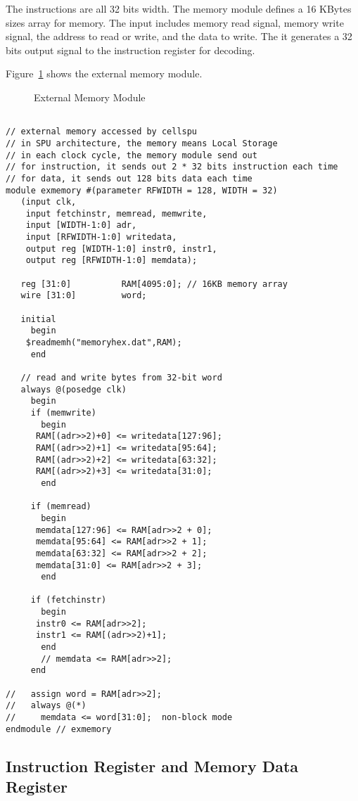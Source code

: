 \documentclass[preprint,authoryear,12pt]{elsarticle}
\begin{document}
The instructions are all 32 bits width. The memory module defines a 16
KBytes sizes array for memory. The input includes memory read signal,
memory write signal, the address to read or write, and the data to
write. The it generates a 32 bits output signal to the instruction
register for decoding.

Figure~\ref{fig:mem} shows the external memory module.

\begin{figure}
\centering
{}
\caption{External Memory Module}
\label{fig:mem}
\end{figure}


\begin{verbatim}

// external memory accessed by cellspu
// in SPU architecture, the memory means Local Storage
// in each clock cycle, the memory module send out
// for instruction, it sends out 2 * 32 bits instruction each time
// for data, it sends out 128 bits data each time
module exmemory #(parameter RFWIDTH = 128, WIDTH = 32)
   (input clk,
    input fetchinstr, memread, memwrite,
    input [WIDTH-1:0] adr,
    input [RFWIDTH-1:0] writedata,
    output reg [WIDTH-1:0] instr0, instr1,
    output reg [RFWIDTH-1:0] memdata);

   reg [31:0] 		   RAM[4095:0]; // 16KB memory array
   wire [31:0] 		   word;

   initial
     begin
	$readmemh("memoryhex.dat",RAM);
     end

   // read and write bytes from 32-bit word
   always @(posedge clk)
     begin
     if (memwrite)
       begin
	  RAM[(adr>>2)+0] <= writedata[127:96];
	  RAM[(adr>>2)+1] <= writedata[95:64];
	  RAM[(adr>>2)+2] <= writedata[63:32];
	  RAM[(adr>>2)+3] <= writedata[31:0];
       end

     if (memread)
       begin
	  memdata[127:96] <= RAM[adr>>2 + 0];
	  memdata[95:64] <= RAM[adr>>2 + 1];
	  memdata[63:32] <= RAM[adr>>2 + 2];
	  memdata[31:0] <= RAM[adr>>2 + 3];
       end
	
     if (fetchinstr)
       begin
	  instr0 <= RAM[adr>>2];
	  instr1 <= RAM[(adr>>2)+1];
       end
       // memdata <= RAM[adr>>2];
     end
   
//   assign word = RAM[adr>>2];
//   always @(*)
//     memdata <= word[31:0];  non-block mode
endmodule // exmemory

\end{verbatim}

\subsection{Instruction Register and Memory Data Register}
\end{document}
